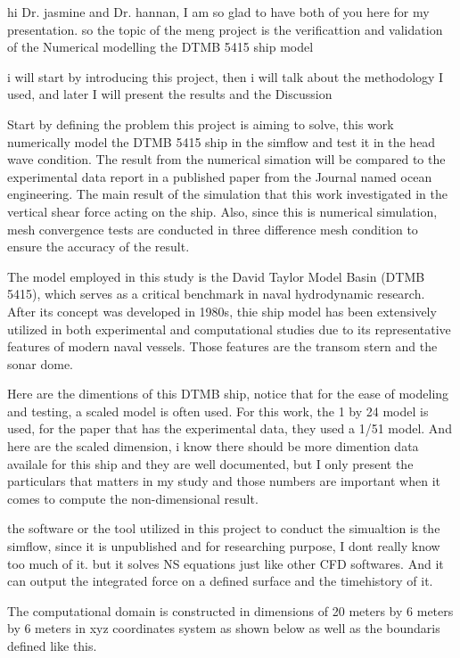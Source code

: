 \documentclass[17pt]{extarticle} %
\begin{document}
\setlength{\parskip}{1em} 
\setlength{\parindent}{0pt}
hi Dr. jasmine and Dr. hannan, I am so glad to have both of you here for my presentation.
so the topic of the meng project is the verificattion and validation of the Numerical
modelling the DTMB 5415 ship model

i will start by introducing this project, then i will talk about the methodology I used, and later I will present the results and the Discussion

Start by defining the problem this project is aiming to solve, this work numerically 
model the DTMB 5415 ship in the simflow and test it in the head wave condition. The
result from the numerical simation will be compared to the experimental data report in a published
paper from the Journal named ocean engineering. The main result of the simulation that this work 
investigated in the vertical shear force acting on the ship. Also, since this is numerical simulation,
mesh convergence tests are conducted in three difference mesh condition to ensure the accuracy of the result.

The model employed in this study is the David Taylor Model Basin (DTMB 5415), which serves as a 
critical benchmark in naval hydrodynamic research. After its concept was developed in 1980s, thie ship model 
has been extensively utilized in both experimental and computational studies due to its representative features of modern naval vessels.
Those features are the transom stern and the sonar dome.

Here are the dimentions of this DTMB ship, notice that for the ease of modeling and testing, a scaled model is often used.
For this work, the 1 by 24 model is used, for the paper that has the experimental data, they used a 1/51 model.
And here are the scaled dimension, i know there should be more dimention data availale for this ship and they are well documented,
but I only present the particulars that matters in my study and those numbers are important when it comes to compute the non-dimensional result.

the software or the tool utilized in this project to conduct the simualtion is the simflow, since it is unpublished and for researching 
purpose, I dont really know too much of it. but it solves NS equations just like other CFD softwares. And it can
output the integrated force on a defined surface and the timehistory of it.

The computational domain is constructed in dimensions of 20 meters by 6 meters by 6 meters in xyz coordinates 
system as shown below as well as the boundaris defined like this.
\end{document}
